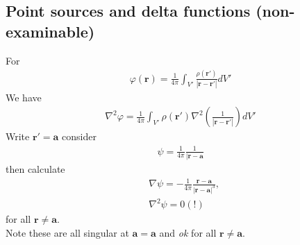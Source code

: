\documentclass[a4paper]{article}
\begin{document}
\begin{eg}
\subsection{Point sources and delta functions (non-examinable)}
For
\begin{equation*}
\begin{aligned}
\varphi\left(\mathbf{r}\right) = \frac{1}{4\pi} \int_{V'} \frac{\rho\left(\mathbf{r}'\right)}{|\mathbf{r}-\mathbf{r'}|} dV'
\end{aligned}
\end{equation*}
We have
\begin{equation}\label{eq:10}
\begin{aligned}
\nabla^2 \varphi = \frac{1}{4\pi} \int_{V'} \rho \left(\mathbf{r}'\right) \nabla^2 \left(\frac{1}{|\mathbf{r}-\mathbf{r}'|}\right) dV'
\end{aligned}
\end{equation}
Write $\mathbf{r}' = \mathbf{a}$ consider
\begin{equation*}
\begin{aligned}
\psi = \frac{1}{4\pi}\frac{1}{|\mathbf{r}-\mathbf{a}}
\end{aligned}
\end{equation*}
then calculate
\begin{equation*}
\begin{aligned}
&\nabla\psi = -\frac{1}{4\pi} \frac{\mathbf{r}-\mathbf{a}}{|\mathbf{r}-\mathbf{a}|^3},\\
&\nabla^2 \psi = 0(!)
\end{aligned}
\end{equation*}
for all $\mathbf{r}\neq \mathbf{a}$.\\
Note these are all singular at $\mathbf{a}=\mathbf{a}$ and \emph{ok} for all $\mathbf{r}\neq \mathbf{a}$.\\


\end{eg}
\end{document}

